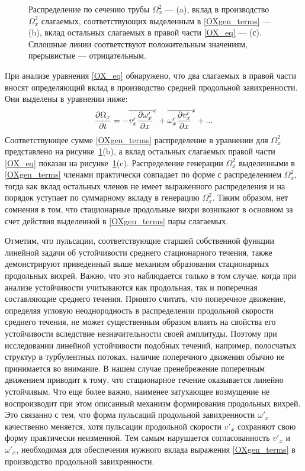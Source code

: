 \begin{figure}
\caption{Распределение по сечению трубы $\Omega_x^2$ --- (a), вклад в производство $\Omega_x^2$ слагаемых, соответствующих выделенным в \eqref{OXgen_terms} --- (b), вклад остальных слагаемых в правой части \eqref{OX_eq} --- (с). Сплошные линии соответствуют положительным значениям, прерывистые --- отрицательным.}
\label{OXgen_pic}
\end{figure}

При анализе уравнения \eqref{OX_eq} обнаружено, что два слагаемых в правой части вносят определяющий вклад в производство средней продольной завихренности. Они выделены в уравнении ниже:
\begin{equation}\label{OXgen_terms}
\frac{\partial \Omega_x}{\partial t} = - \overline{v'_x \frac{\partial \omega'_x}{\partial x}}^x + \overline{ \omega'_x \frac{\partial v'_x}{\partial x} }^x + ... 
\end{equation}
Соответствующее сумме \eqref{OXgen_terms}  распределение в уравнении для $\Omega_x^2$ представлено на рисунке~\ref{OXgen_pic}(b), а вклад остальных слагаемых правой части \eqref{OX_eq} показан на рисунке~\ref{OXgen_pic}(c). Распределение генерации $\Omega_x^2$ выделенными в \eqref{OXgen_terms} членами практически совпадает по форме с распределением $\Omega_x^2$, тогда как вклад остальных членов не имеет выраженного распределения и на порядок уступает по суммарному вкладу в генерацию $\Omega_x^2$. Таким образом, нет сомнения в том, что стационарные продольные вихри возникают в основном за счет действия выделенной в \eqref{OXgen_terms} пары слагаемых.

Отметим, что пульсации, соответствующие старшей собственной функции линейной задачи об устойчивости среднего стационарного течения, также демонстрируют приведенный выше механизм образования стационарных продольных вихрей. Важно, что это наблюдается только в том случае, когда при анализе устойчивости учитываются как продольная, так и поперечная составляющие среднего течения. Принято считать, что поперечное движение, определяя угловую неоднородность в распределении продольной скорости среднего течения, не может существенным образом влиять на свойства его устойчивости вследствие незначительности своей амплитуды. Поэтому при исследовании линейной устойчивости подобных течений, например, полосчатых структур в турбулентных потоках, наличие поперечного движения обычно не принимается во внимание. В нашем случае пренебрежение поперечным движением приводит к тому, что стационарное течение оказывается линейно устойчивым. Что еще более важно, наименее затухающее возмущение не воспроизводит при этом описанный механизм формирования продольных вихрей. Это связанно с тем, что форма пульсаций продольной завихренности $\omega'_x$ качественно меняется, хотя пульсации продольной скорости $v'_x$ сохраняют свою форму практически неизменной. Тем самым нарушается согласованность  $v'_x$ и $\omega'_x$, необходимая для обеспечения нужного вклада выражения \eqref{OXgen_terms} в производство продольной завихренности.

